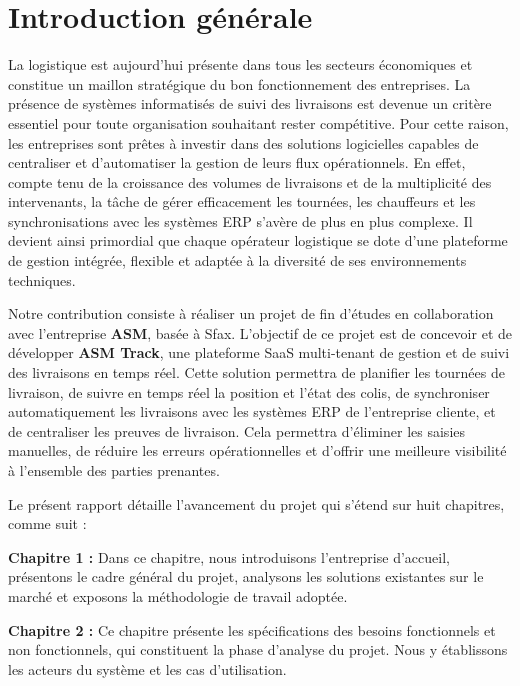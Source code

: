 \chapter*{Introduction générale}

La logistique est aujourd'hui présente dans tous les secteurs économiques et constitue un
maillon stratégique du bon fonctionnement des entreprises. La présence de systèmes
informatisés de suivi des livraisons est devenue un critère essentiel pour toute organisation
souhaitant rester compétitive. Pour cette raison, les entreprises sont prêtes à investir dans des
solutions logicielles capables de centraliser et d'automatiser la gestion de leurs flux
opérationnels. En effet, compte tenu de la croissance des volumes de livraisons et de la
multiplicité des intervenants, la tâche de gérer efficacement les tournées, les chauffeurs et les
synchronisations avec les systèmes ERP s'avère de plus en plus complexe. Il devient ainsi
primordial que chaque opérateur logistique se dote d'une plateforme de gestion intégrée,
flexible et adaptée à la diversité de ses environnements techniques.

Notre contribution consiste à réaliser un projet de fin d'études en collaboration avec
l'entreprise \textbf{ASM}, basée à Sfax. L'objectif de ce projet est de concevoir et de
développer \textbf{ASM Track}, une plateforme SaaS multi-tenant de gestion et de suivi des
livraisons en temps réel. Cette solution permettra de planifier les tournées de livraison,
de suivre en temps réel la position et l'état des colis, de synchroniser automatiquement
les livraisons avec les systèmes ERP de l'entreprise cliente, et de centraliser les preuves
de livraison. Cela permettra d'éliminer les saisies manuelles, de réduire les erreurs
opérationnelles et d'offrir une meilleure visibilité à l'ensemble des parties prenantes.

Le présent rapport détaille l'avancement du projet qui s'étend sur huit chapitres, comme suit :

\textbf{Chapitre 1 :} Dans ce chapitre, nous introduisons l'entreprise d'accueil, présentons
le cadre général du projet, analysons les solutions existantes sur le marché et exposons
la méthodologie de travail adoptée.

\textbf{Chapitre 2 :} Ce chapitre présente les spécifications des besoins fonctionnels et
non fonctionnels, qui constituent la phase d'analyse du projet. Nous y établissons les
acteurs du système et les cas d'utilisation.

